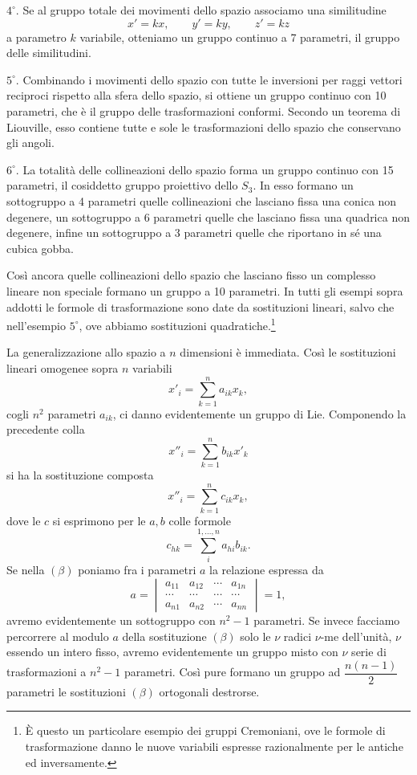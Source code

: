 \documentclass[11pt]{book}
\begin{document}
$4^{\circ}$. Se al gruppo totale dei movimenti dello spazio associamo una similitudine
\[
 x'=kx,
 \qquad y'=ky,
 \qquad z'=kz
\]
a parametro $k$ variabile, otteniamo un gruppo continuo a 7 parametri, il gruppo delle similitudini.

$5^{\circ}$. Combinando i movimenti dello spazio con tutte le inversioni per raggi vettori reciproci rispetto alla sfera dello spazio, si ottiene un gruppo continuo con 10 parametri, che è il gruppo delle trasformazioni conformi. Secondo un teorema di Liouville, esso contiene tutte e sole le trasformazioni dello spazio che conservano gli angoli.

$6^{\circ}$. La totalità delle collineazioni dello spazio forma un gruppo continuo con 15 parametri, il cosiddetto gruppo proiettivo dello $S_3$. In esso formano un sottogruppo a 4 parametri quelle collineazioni che lasciano fissa una conica non degenere, un sottogruppo a 6 parametri quelle che lasciano fissa una quadrica non degenere, infine un sottogruppo a 3 parametri quelle che riportano in sé una cubica gobba.

Così ancora quelle collineazioni dello spazio che lasciano fisso un complesso lineare non speciale formano un gruppo a 10 parametri. In tutti gli esempi sopra addotti le formole di trasformazione sono date da sostituzioni lineari, salvo che nell'esempio $5^{\circ}$, ove abbiamo sostituzioni quadratiche.\footnote{È questo un particolare esempio dei gruppi Cremoniani, ove le formole di trasformazione danno le nuove variabili espresse razionalmente per le antiche ed inversamente.}

La generalizzazione allo spazio a $n$ dimensioni è immediata. Così le sostituzioni lineari omogenee sopra $n$ variabili
\begin{equation*}\tag{$\beta$}
 x'_i=\sum\limits_{k=1}^n a_{ik}x_k,
\end{equation*}
cogli $n^2$ parametri $a_{ik}$, ci danno evidentemente un gruppo di Lie. Componendo la precedente colla
\[
 x''_i=\sum\limits_{k=1}^n b_{ik}x'_k
\]
si ha la sostituzione composta
\[
 x''_i=\sum\limits_{k=1}^n c_{ik}x_k,
\]
dove le $c$ si esprimono per le $a,b$ colle formole
\[
 c_{hk}=\sum\limits_i^{1,\ldots,n} a_{hi}b_{ik}.
\]
Se nella $(\beta)$ poniamo fra i parametri $a$ la relazione espressa da
\[
 a=\begin{vmatrix}
 a_{11}&a_{12}&\cdots&a_{1n}\\
 \cdots&\cdots&\cdots&\cdots\\
 a_{n1}&a_{n2}&\cdots&a_{nn}
\end{vmatrix}=1,
\]
avremo evidentemente un sottogruppo con $n^2-1$ parametri. Se invece facciamo percorrere al modulo $a$ della sostituzione $(\beta)$ solo le $\nu$ radici $\nu$-me dell'unità, $\nu$ essendo un intero fisso, avremo evidentemente un gruppo misto con $\nu$ serie di trasformazioni a $n^2-1$ parametri. Così pure formano un gruppo ad $\dfrac{n(n-1)}{2}$ parametri le sostituzioni $(\beta)$ ortogonali destrorse.
\end{document}
